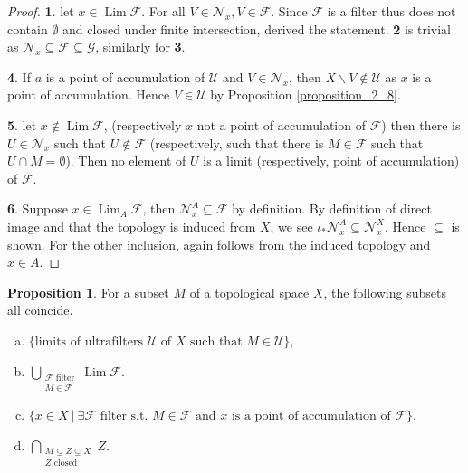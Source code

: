 \documentclass[10pt]{article}
\numberwithin{equation}{section}
\theoremstyle{definition}
\newtheorem{proposition}{Proposition}[subsection]
\DeclareMathOperator{\Lim}{Lim}
\newcommand{\F}[0]{\mathcal{F}}
\newcommand{\sep}[0]{\:|\:}
\newcommand{\Nfil}[0]{\mathcal{N}}
\newcommand{\cF}[0]{\mathcal{F}}
\begin{document}
\begin{proof}
    \textbf{1}. let $x\in\Lim\F$. For all $V\in\Nfil_x,V\in\F$. Since $\F$ is a filter thus does not contain $\emptyset$ and closed under finite intersection, derived the statement. \textbf{2} is trivial as $\Nfil_x\subseteq\F\subseteq\mathcal{G}$, similarly for \textbf{3}.
    \par \textbf{4}. If $a$ is a point of accumulation of $\mathcal{U}$ and $V\in\mathcal{N}_x$, then $X\backslash V\not\in\mathcal{U}$ as $x$ is a point of accumulation. Hence $V\in\mathcal{U}$ by Proposition \ref{proposition_2_8}.
    \par \textbf{5}. let $x\not\in\Lim\mathcal{F}$, (respectively $x$ not a point of accumulation of $\mathcal{F}$) then there is $U\in\mathcal{N}_x$ such that $U\not\in\mathcal{F}$ (respectively, such that there is $M\in\mathcal{F}$ such that $U\cap M=\emptyset$). Then no element of $U$ is a limit (respectively, point of accumulation) of $\mathcal{F}$.
    \par \textbf{6}. Suppose $x\in \Lim_A\cF$, then $\Nfil_x^A\subseteq\cF$ by definition. By definition of direct image and that the topology is induced from $X$, we see $\iota_*\Nfil_x^A \subseteq \Nfil_x^X$. Hence $\subseteq$ is shown. For the other inclusion, again follows from the induced topology and $x\in A$.
\end{proof}
\begin{proposition}
    \label{proposition_1}
    For a subset $M$ of a topological space $X$, the following subsets all coincide.
    \begin{enumerate}[a.]
        \item $\{\text{limits of ultrafilters $\mathcal{U}$ of $X$ such that $M\in\mathcal{U}$}\}$,
        \item $\bigcup_{\substack{\text{$\mathcal{F}$ filter}\\\text{$M\in\mathcal{F}$}}}\Lim\mathcal{F}$.
        \item $\{x\in X\sep \text{$\exists \mathcal{F}$ filter s.t. $M\in\mathcal{F}$ and $x$ is a point of accumulation of $\mathcal{F}$}\}$.
        \item $\bigcap_{\substack{M\subseteq Z\subseteq X\\\text{$Z$ closed}}}Z$.
    \end{enumerate}
\end{proposition}
\end{document}
